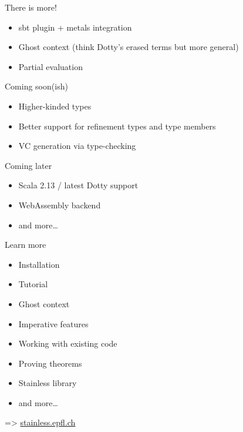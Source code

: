 \documentclass[
  ignorenonframetext,
]{beamer}
\providecommand{\tightlist}{%
  \setlength{\itemsep}{0pt}\setlength{\parskip}{0pt}}
\begin{document}
\begin{frame}{There is more!}
\protect\hypertarget{there-is-more}{}

\begin{itemize}
\tightlist
\item
  sbt plugin + metals integration
\item
  Ghost context (think Dotty's erased terms but more general)
\item
  Partial evaluation
\end{itemize}

\end{frame}

\begin{frame}{Coming soon(ish)}
\protect\hypertarget{coming-soonish}{}

\begin{itemize}
\tightlist
\item
  Higher-kinded types
\item
  Better support for refinement types and type members
\item
  VC generation via type-checking
\end{itemize}

\end{frame}

\begin{frame}{Coming later}
\protect\hypertarget{coming-later}{}

\begin{itemize}
\tightlist
\item
  Scala 2.13 / latest Dotty support
\item
  WebAssembly backend
\item
  and more\ldots{}
\end{itemize}

\end{frame}

\begin{frame}{Learn more}
\protect\hypertarget{learn-more}{}

\begin{itemize}
\tightlist
\item
  Installation
\item
  Tutorial
\item
  Ghost context
\item
  Imperative features
\item
  Working with existing code
\item
  Proving theorems
\item
  Stainless library
\item
  and more\ldots{}
\end{itemize}

=\textgreater{} \href{https://stainless.epfl.ch}{stainless.epfl.ch}

\end{frame}
\end{document}
